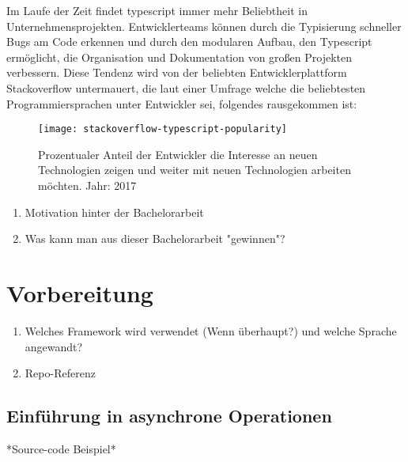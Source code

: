 Im Laufe der Zeit findet typescript immer mehr Beliebtheit in Unternehmensprojekten. Entwicklerteams können durch die Typisierung schneller Bugs am Code erkennen und durch den modularen Aufbau, den Typescript ermöglicht, die Organisation und Dokumentation von großen Projekten verbessern. Diese Tendenz wird von der beliebten Entwicklerplattform Stackoverflow untermauert, die laut einer Umfrage welche die beliebtesten Programmiersprachen unter Entwickler sei, folgendes rausgekommen ist:

\begin{figure}[H]
\centering
\texttt{[image: stackoverflow-typescript-popularity]}
\caption{Prozentualer Anteil der Entwickler die Interesse an neuen Technologien zeigen und weiter mit neuen Technologien arbeiten möchten. Jahr: 2017 \cite{typescript-survey}}
\end{figure}

\begin{enumerate} 
\item Motivation hinter der Bachelorarbeit
\item Was kann man aus dieser Bachelorarbeit "gewinnen"?
\end{enumerate}

\section{Vorbereitung}
\begin{enumerate} 
\item Welches Framework wird verwendet (Wenn überhaupt?) und welche Sprache angewandt?
\item Repo-Referenz
\end{enumerate}

\subsection{Einführung in asynchrone Operationen}
*Source-code Beispiel*